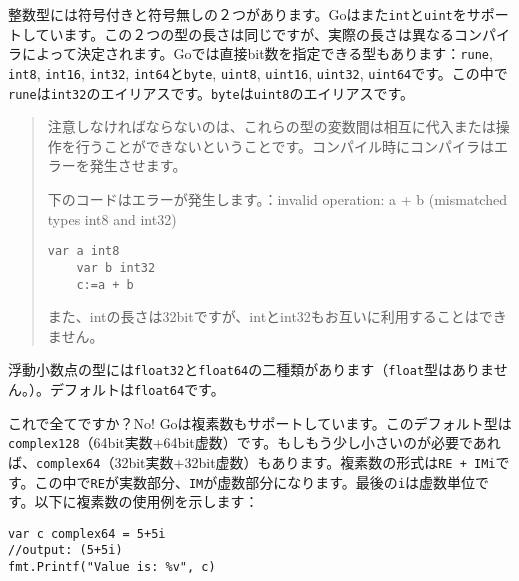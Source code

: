 整数型には符号付きと符号無しの２つがあります。Goはまた\texttt{int}と\texttt{uint}をサポートしています。この２つの型の長さは同じですが、実際の長さは異なるコンパイラによって決定されます。Goでは直接bit数を指定できる型もあります：\texttt{rune}, \texttt{int8}, \texttt{int16}, \texttt{int32}, \texttt{int64}と\texttt{byte}, \texttt{uint8}, \texttt{uint16}, \texttt{uint32}, \texttt{uint64}です。この中で\texttt{rune}は\texttt{int32}のエイリアスです。\texttt{byte}は\texttt{uint8}のエイリアスです。

\begin{quote}
注意しなければならないのは、これらの型の変数間は相互に代入または操作を行うことができないということです。コンパイル時にコンパイラはエラーを発生させます。

下のコードはエラーが発生します。：invalid operation: a + b (mismatched types int8 and int32)
\begin{lstlisting}[numbers=none]
    var a int8
    var b int32
    c:=a + b
\end{lstlisting}
また、intの長さは32bitですが、intとint32もお互いに利用することはできません。
\end{quote}

浮動小数点の型には\texttt{float32}と\texttt{float64}の二種類があります（\texttt{float}型はありません。）。デフォルトは\texttt{float64}です。

これで全てですか？No! Goは複素数もサポートしています。このデフォルト型は\texttt{complex128}（64bit実数+64bit虚数）です。もしもう少し小さいのが必要であれば、\texttt{complex64}（32bit実数+32bit虚数）もあります。複素数の形式は\texttt{RE + IMi}です。この中で\texttt{RE}が実数部分、\texttt{IM}が虚数部分になります。最後の\texttt{i}は虚数単位です。以下に複素数の使用例を示します：

\begin{lstlisting}[numbers=none]
var c complex64 = 5+5i
//output: (5+5i)
fmt.Printf("Value is: %v", c)
\end{lstlisting}
